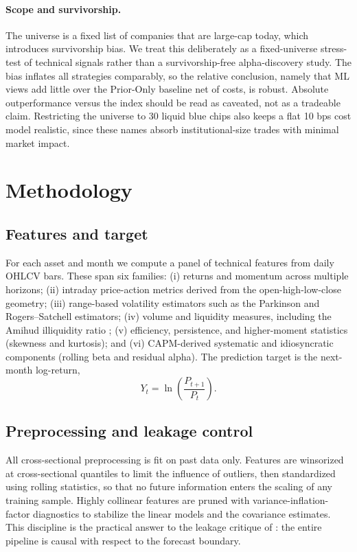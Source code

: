 \documentclass[11pt]{article}
\begin{document}
\paragraph{Scope and survivorship.}
The universe is a fixed list of companies that are large-cap today, which introduces survivorship
bias. We treat this deliberately as a fixed-universe stress-test of technical signals rather than
a survivorship-free alpha-discovery study. The bias inflates all strategies comparably, so the
relative conclusion, namely that ML views add little over the Prior-Only baseline net of costs,
is robust. Absolute outperformance versus the index should be read as caveated, not as a
tradeable claim. Restricting the universe to 30 liquid blue chips also keeps a flat 10 bps cost
model realistic, since these names absorb institutional-size trades with minimal market impact.

\section{Methodology}

\subsection{Features and target}
For each asset and month we compute a panel of technical features from daily OHLCV bars. These
span six families: (i) returns and momentum across multiple horizons; (ii) intraday price-action
metrics derived from the open-high-low-close geometry; (iii) range-based volatility estimators
such as the Parkinson \citep{parkinson1980extreme} and Rogers--Satchell estimators; (iv) volume
and liquidity measures, including the Amihud illiquidity ratio \citep{amihud2002illiquidity};
(v) efficiency, persistence, and higher-moment statistics (skewness and kurtosis); and (vi)
CAPM-derived systematic and idiosyncratic components (rolling beta and residual alpha). The
prediction target is the next-month log-return,
\begin{equation}
Y_t = \ln\!\left(\frac{P_{t+1}}{P_t}\right).
\end{equation}

\subsection{Preprocessing and leakage control}
All cross-sectional preprocessing is fit on past data only. Features are winsorized at
cross-sectional quantiles to limit the influence of outliers, then standardized using rolling
statistics, so that no future information enters the scaling of any training sample. Highly
collinear features are pruned with variance-inflation-factor diagnostics to stabilize the linear
models and the covariance estimates. This discipline is the practical answer to the leakage
critique of \citet{lopezdeprado2018advances}: the entire pipeline is causal with respect to the
forecast boundary.
\end{document}

